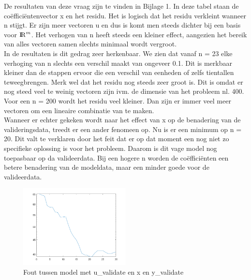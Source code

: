 De resultaten van deze vraag zijn te vinden in Bijlage 1. In deze tabel staan de co\"effici\"entenvector x en het residu. Het is logisch dat het residu verkleint wanneer n stijgt. Er zijn meer vectoren u en dus is komt men steeds dichter bij een basis voor ${\rm I\!R}^{m}$. Het verhogen van n heeft steeds een kleiner effect, aangezien het bereik van alles vectoren samen slechts minimaal wordt vergroot. \\[12pt]

In de resultaten is dit gedrag zeer herkenbaar. We zien dat vanaf n = 23 elke verhoging van n slechts een verschil maakt van ongeveer 0.1. Dit is merkbaar kleiner dan de stappen ervoor die een verschil van eenheden of zelfs tientallen teweegbrengen. Merk wel dat het residu nog steeds zeer groot is. Dit is omdat er nog steed veel te weinig vectoren zijn ivm. de dimensie van het probleem nl. 400. Voor een n = 200 wordt het residu veel kleiner. Dan zijn er immer veel meer vectoren om een lineaire combinatie van te maken.\\[12pt]

Wanneer er echter gekeken wordt naar het effect van x op de benadering van de valideringsdata, treedt er een ander fenomeen op. Nu is er een minimum op n = 20. Dit valt te verklaren door het feit dat er op dat moment een nog niet zo specifieke oplossing is voor het probleem. Daarom is dit vage model nog toepasbaar op da valideerdata. Bij een hogere n worden de co\"effici\"enten een betere benadering van de modeldata, maar een minder goede voor de valideerdata.\\

\begin{figure}[H]
  \centering
  \includegraphics[width=0.5\textwidth]{Tekeningen/LeastSquare_Validate.png}
  \caption{Fout tussen model met u\_validate en x en y\_validate}
\end{figure}


